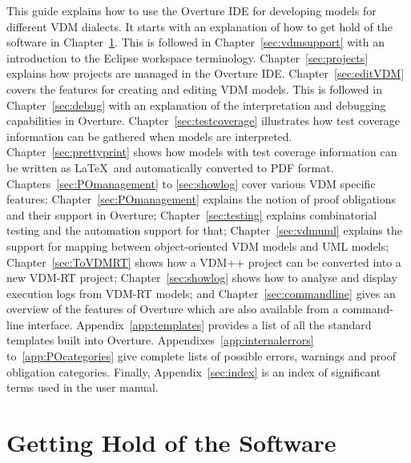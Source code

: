 \documentclass{overturerepchap}
\begin{document}
This guide explains how to use the Overture IDE for developing models
for different VDM dialects. It starts with an explanation
of how to get hold of the software in
Chapter~\ref{sec:install}. This is followed in
Chapter~\ref{sec:vdmsupport} with an introduction to the Eclipse
workspace terminology. Chapter~\ref{sec:projects} explains how
projects are managed in the Overture IDE. Chapter~\ref{sec:editVDM}
covers the features for creating and editing VDM models. This is
followed in Chapter~\ref{sec:debug} with an explanation of the
interpretation and debugging capabilities in Overture.
Chapter~\ref{sec:testcoverage} illustrates how test coverage
information can be gathered when models are interpreted.
Chapter~\ref{sec:prettyprint} shows how models with test
coverage information can be written as
\LaTeX\ and automatically converted to PDF format. 
Chapters~\ref{sec:POmanagement} to \ref{sec:showlog} cover various
VDM specific features: Chapter~\ref{sec:POmanagement}
explains the notion of proof obligations and their support in
Overture; Chapter~\ref{sec:testing} explains
combinatorial testing and the automation support for that;
Chapter~\ref{sec:vdmuml} explains the support for mapping between
object-oriented VDM models and UML models; Chapter~\ref{sec:ToVDMRT}
shows how a VDM++ project can be 
converted into a new VDM-RT project; Chapter~\ref{sec:showlog} shows
how to analyse and display execution logs from VDM-RT models; and
Chapter~\ref{sec:commandline} gives an
overview of the features of Overture which are also available from
a command-line interface. Appendix~\ref{app:templates} provides a list
of all the standard templates built into Overture. 
Appendixes~\ref{app:internalerrors}
to~\ref{app:POcategories} give complete lists of possible errors,
warnings and proof obligation categories.
Finally, Appendix~\ref{sec:index} is an index of significant terms used in the
user manual. 


\chapter{Getting Hold of the Software}\label{sec:install}
\end{document}
